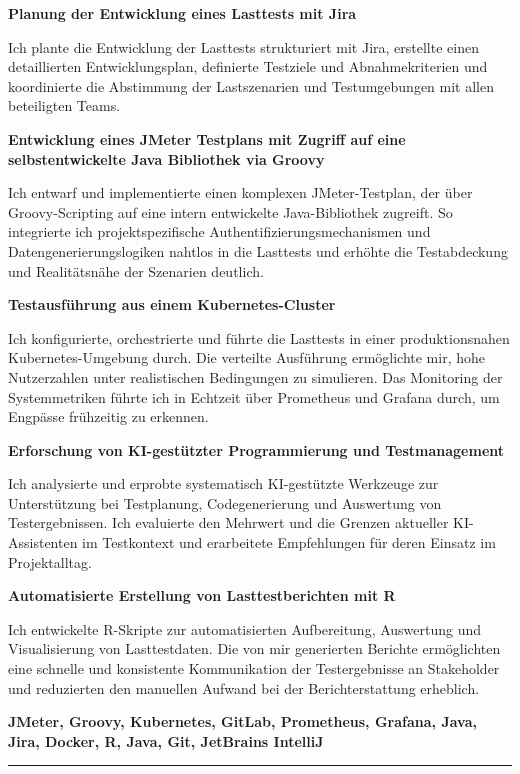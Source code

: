 \documentclass[9pt,a4paper]{article}
\newcommand{\phresptitle}[1]{{\fontsize{7.5}{8.4}\selectfont\bfseries #1\par}}
\newcommand{\phrespdesc}[1]{{\color{mutedfg}\fontsize{7}{8.2}\selectfont #1\par}}
\newcommand{\phtoolline}[1]{{\color{accent}\fontsize{6.8}{7.6}\selectfont\bfseries #1\par}}
\begin{document}
\vspace{0.5mm}
\phresptitle{Planung der Entwicklung eines Lasttests mit Jira}
\phrespdesc{Ich plante die Entwicklung der Lasttests strukturiert mit Jira, erstellte einen detaillierten Entwicklungsplan, definierte Testziele und Abnahmekriterien und koordinierte die Abstimmung der Lastszenarien und Testumgebungen mit allen beteiligten Teams.}
\vspace{0.8mm}
\phresptitle{Entwicklung eines JMeter Testplans mit Zugriff auf eine selbstentwickelte Java Bibliothek via Groovy}
\phrespdesc{Ich entwarf und implementierte einen komplexen JMeter-Testplan, der über Groovy-Scripting auf eine intern entwickelte Java-Bibliothek zugreift. So integrierte ich projektspezifische Authentifizierungsmechanismen und Datengenerierungslogiken nahtlos in die Lasttests und erhöhte die Testabdeckung und Realitätsnähe der Szenarien deutlich.}
\vspace{0.8mm}
\phresptitle{Testausführung aus einem Kubernetes-Cluster}
\phrespdesc{Ich konfigurierte, orchestrierte und führte die Lasttests in einer produktionsnahen Kubernetes-Umgebung durch. Die verteilte Ausführung ermöglichte mir, hohe Nutzerzahlen unter realistischen Bedingungen zu simulieren. Das Monitoring der Systemmetriken führte ich in Echtzeit über Prometheus und Grafana durch, um Engpässe frühzeitig zu erkennen.}
\vspace{0.8mm}
\phresptitle{Erforschung von KI-gestützter Programmierung und Testmanagement}
\phrespdesc{Ich analysierte und erprobte systematisch KI-gestützte Werkzeuge zur Unterstützung bei Testplanung, Codegenerierung und Auswertung von Testergebnissen. Ich evaluierte den Mehrwert und die Grenzen aktueller KI-Assistenten im Testkontext und erarbeitete Empfehlungen für deren Einsatz im Projektalltag.}
\vspace{0.8mm}
\phresptitle{Automatisierte Erstellung von Lasttestberichten mit R}
\phrespdesc{Ich entwickelte R-Skripte zur automatisierten Aufbereitung, Auswertung und Visualisierung von Lasttestdaten. Die von mir generierten Berichte ermöglichten eine schnelle und konsistente Kommunikation der Testergebnisse an Stakeholder und reduzierten den manuellen Aufwand bei der Berichterstattung erheblich.}
\vspace{0.8mm}

\phtoolline{JMeter, Groovy, Kubernetes, GitLab, Prometheus, Grafana, Java, Jira, Docker, R, Java, Git, JetBrains IntelliJ}

\vspace{1.5mm}
{\color{rulefg}\rule{\linewidth}{0.25pt}\par}
\vspace{2.5mm}
\end{document}
